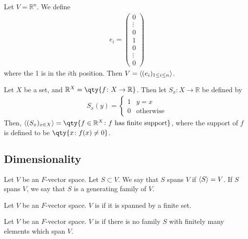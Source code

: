     \begin{example}
        Let $V = \mathbb R^n$.
        We define
        \begin{align*}
            e_i = \begin{pmatrix}
                0 \\ \vdots \\ 0 \\ 1 \\ 0 \\ \vdots \\ 0
            \end{pmatrix}
        \end{align*}
        where the 1 is in the $i$th position.
        Then $V = \langle{} (e_i)_{1 \leq i \leq n} \rangle$.
    \end{example}
    \begin{example}
        Let $X$ be a set, and $\mathbb R^X = \qty{f \colon X \to \mathbb R}$.
        Then let $S_x \colon X \to \mathbb R$ be defined by
        \begin{align*}
            S_x(y) = \begin{cases}
                1 & y = x            \\
                0 & \text{otherwise}
            \end{cases}
        \end{align*}
        Then, $\genset{(S_x)_{x \in X}} = \qty{f \in \mathbb R^X \colon f \text{ has finite support}}$,
        where the support of $f$ is defined to be $\qty{x \colon f(x) \neq 0}$.
    \end{example}

    \subsection{Dimensionality}
    \begin{definition}
        Let $V$ be an $F$-vector space.
        Let $S \subset V$.
        We say that $S$ spans $V$ if $\langle{} S \rangle = V$.
        If $S$ spans $V$, we say that $S$ is a generating family of $V$.
    \end{definition}

    \begin{definition}
        Let $V$ be an $F$-vector space.
        $V$ is  if it is spanned by a finite set.
    \end{definition}

    \begin{definition}
        Let $V$ be an $F$-vector space.
        $V$ is  if there is no family $S$  with finitely many elements which span $V$.
    \end{definition}

